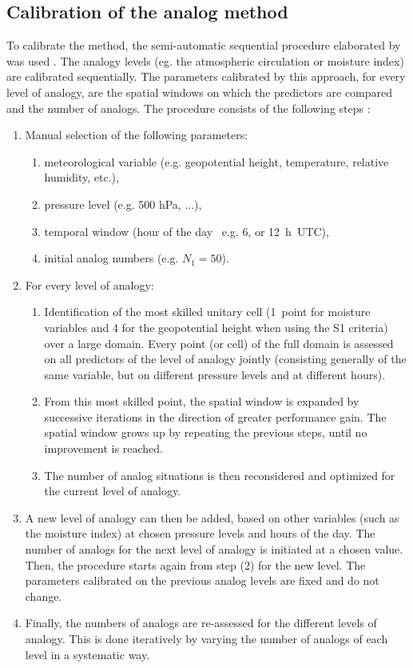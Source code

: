 \documentclass[hess, manuscript]{copernicus}
\begin{document}
\subsection{Calibration of the analog method}
\label{sec:calibration}

To calibrate the method, the semi-automatic sequential procedure elaborated by \citet{Bontron2004} was used \cite[see also ][]{Horton2012a, Radanovics2013, BenDaoud2016}. The analogy levels (eg. the atmospheric circulation or moisture index) are calibrated sequentially. The parameters calibrated by this approach, for every level of analogy, are the spatial windows on which the predictors are compared and the number of analogs. The procedure consists of the following steps \citep{Bontron2004}:

\begin{enumerate}
	\item Manual selection of the following parameters:
	\begin{enumerate}
		\item meteorological variable (e.g. geopotential height, temperature, relative humidity, etc.),
		\item pressure level (e.g. 500 hPa, ...),
		\item temporal window (hour of the day \textendash\ e.g. 6, or 12~h~UTC),
		\item initial analog numbers (e.g. $N_{1}=50$).
	\end{enumerate}
	
	\item For every level of analogy:
	\begin{enumerate}
		\item Identification of the most skilled unitary cell (1~point for moisture variables and 4 for the geopotential height when using the S1 criteria) over a large domain. Every point (or cell) of the full domain is assessed on all predictors of the level of analogy jointly (consisting generally of the same variable, but on different pressure levels and at different hours).
		\item From this most skilled point, the spatial window is expanded by successive iterations in the direction of greater performance gain. The spatial window grows up by repeating the previous steps, until no improvement is reached.
		\item The number of analog situations is then reconsidered and optimized for the current level of analogy.
	\end{enumerate}
	\item A new level of analogy can then be added, based on other variables (such as the moisture index) at chosen pressure levels and hours of the day. The number of analogs for the next level of analogy is initiated at a chosen value. Then, the procedure starts again from step (2) for the new level. The parameters calibrated on the previous analog levels are fixed and do not change. 
	\item Finally, the numbers of analogs are re-assessed for the different levels of analogy. This is done iteratively by varying the number of analogs of each level in a systematic way.
\end{enumerate}
\end{document}
